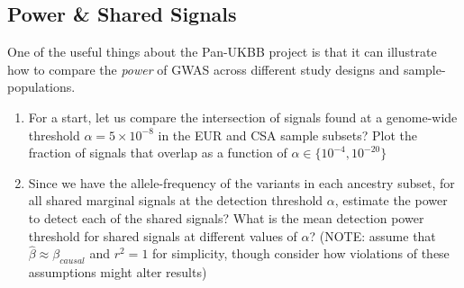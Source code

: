 \documentclass{pset}
\begin{document}
\subsection*{Power \& Shared Signals}

One of the useful things about the Pan-UKBB project is that it can illustrate how to compare the \textit{power} of GWAS across different study designs and sample-populations.

\begin{enumerate}
\item For a start, let us compare the intersection of signals found at a genome-wide threshold $\alpha = 5\times 10^{-8}$ in the EUR and CSA sample subsets? Plot the fraction of signals that overlap as a function of $\alpha \in \{10^{-4}, 10^{-20}\}$
\item Since we have the allele-frequency of the variants in each ancestry subset, for all shared marginal signals at the detection threshold $\alpha$, estimate the power to detect each of the shared signals? What is the mean detection power threshold for shared signals at different values of $\alpha$? (NOTE: assume that $\hat{\beta} \approx \beta_{causal}$ and $r^2 = 1$ for simplicity, though consider how violations of these assumptions might alter results) 
\end{enumerate}
\end{document}
